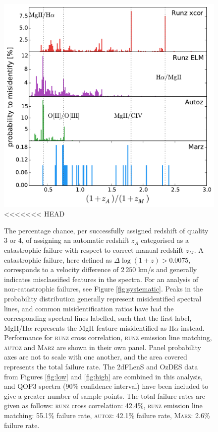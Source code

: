 \documentclass[iop]{emulateapj}
\newcommand{\runz}{\textsc{runz}}
\newcommand{\autoz}{\textsc{autoz}}
\newcommand{\marz}{\textsc{Marz}}
\begin{document}
\begin{figure}[h]
\centering
\includegraphics[width=\columnwidth]{errorRateqop3.pdf}
<<<<<<< HEAD
\caption{The percentage chance, per successfully assigned redshift of quality 3 or 4, of assigning an automatic redshift $z_A$ categorised as a catastrophic failure with respect to correct manual redshift $z_M$. A catastrophic failure, here defined as $\Delta \log(1 + z) > 0.0075$, corresponds to a velocity difference of $2\,250$ km/s and generally indicates misclassified features in the spectra. For an analysis of non-catastrophic failures, see Figure \ref{fig:systematic}. Peaks in the probability distribution generally represent misidentified spectral lines, and common misidentification ratios have had the corresponding spectral lines labelled, such that the first label, MgII/H$\alpha$ represents the MgII feature misidentified as H$\alpha$ instead. Performance for \runz{} cross correlation, \runz{} emission line matching, \autoz{} and \marz{} are shown in their own panel. Panel probability axes are not to scale with one another, and the area covered represents the total failure rate. The 2dFLenS and OzDES data from Figures \ref{fig:low} and \ref{fig:high} are combined in this analysis, and QOP3 spectra (90\% confidence interval) have been included to give a greater number of sample points. The total failure rates are given as follows: \runz{} cross correlation: 42.4\%, \runz{} emission line matching: 55.1\% failure rate, \autoz{}: 42.1\% failure rate, \marz{}: 2.6\% failure rate.}

\end{figure}
\end{document}
